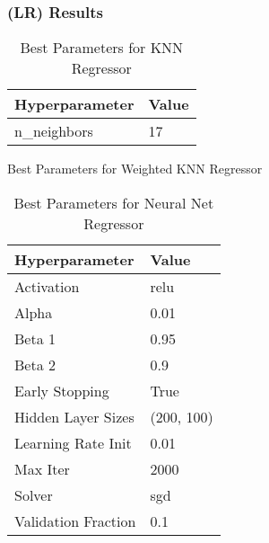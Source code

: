 \documentclass[a4paper, 12pt]{report}
\begin{document}
\subsubsection{(LR) Results}

\begin{table}[H]
    \centering
    \caption{Best Parameters for KNN Regressor}
    \label{tab:best_parameters_knn_LR_Abalone}
    \begin{tabular}{|l|l|}
    \hline
    \textbf{Hyperparameter} & \textbf{Value} \\ \hline
    n\_neighbors & 17 \\ \hline
    \end{tabular}
\end{table}

\begin{table}[H]
    \centering
    \caption{Best Parameters for Weighted KNN Regressor}
    \label{tab:best_parameters_weighted_knn_LR_Abalone}
\end{table}

\begin{table}[H]
    \centering
    \caption{Best Parameters for Neural Net Regressor}
    \label{tab:best_parameters_neural_net_LR_Abalone}
    \begin{tabular}{|l|l|}
    \hline
    \textbf{Hyperparameter} & \textbf{Value} \\ \hline
    Activation & relu \\ \hline
    Alpha & 0.01 \\ \hline
    Beta 1 & 0.95 \\ \hline
    Beta 2 & 0.9 \\ \hline
    Early Stopping & True \\ \hline
    Hidden Layer Sizes & (200, 100) \\ \hline
    Learning Rate Init & 0.01 \\ \hline
    Max Iter & 2000 \\ \hline
    Solver & sgd \\ \hline
    Validation Fraction & 0.1 \\ \hline
    \end{tabular}
\end{table}
\end{document}
